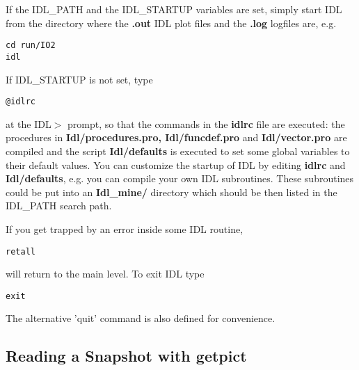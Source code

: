    If the IDL\_PATH and the IDL\_STARTUP variables are set, simply 
   start IDL from the directory where the {\bf *.out} IDL plot files
   and the {\bf *.log} logfiles are, e.g.
\begin{verbatim}
cd run/IO2
idl
\end{verbatim}
   If IDL\_STARTUP is not set, type
\begin{verbatim}
@idlrc
\end{verbatim}
   at the IDL$>$ prompt, so that the commands in the {\bf idlrc} file are
   executed: 
   the procedures in {\bf Idl/procedures.pro, Idl/funcdef.pro} and 
   {\bf Idl/vector.pro} are compiled and 
   the script {\bf Idl/defaults} is executed to set some
   global variables to their default values. You can customize the startup
   of IDL by editing {\bf idlrc} and {\bf Idl/defaults}, e.g. you can
   compile your own IDL subroutines. These subroutines could be put into an 
   {\bf Idl\_mine/} directory which should be then listed in the 
   IDL\_PATH search path.

   If you get trapped by an error inside some IDL routine,
\begin{verbatim}
retall
\end{verbatim}
   will return to the main level. To exit IDL type
\begin{verbatim}
exit
\end{verbatim}
   The alternative 'quit' command is also defined for convenience.

\subsection{Reading a Snapshot with getpict \label{s-getpict}}

